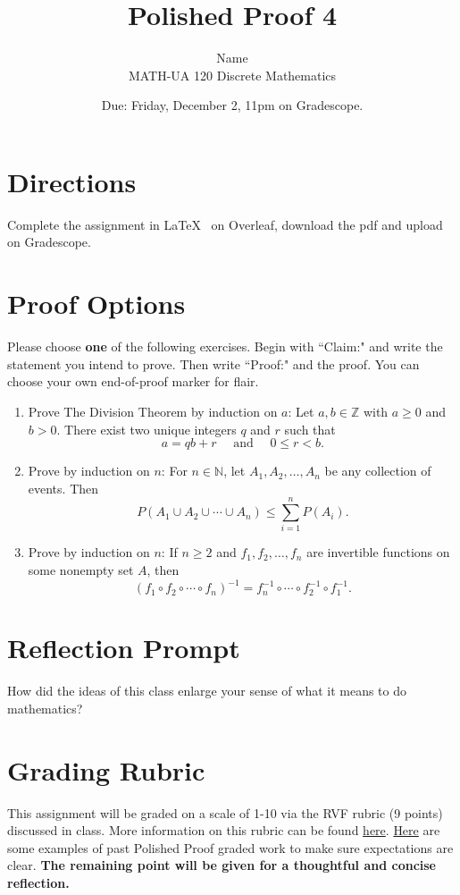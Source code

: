 \documentclass{article}
\title{Polished Proof 4}
\author{%
	Name
	\\
	MATH-UA 120 Discrete Mathematics
}
\date{Due: Friday, December 2, 11pm on Gradescope.}
\theoremstyle{definition}
\begin{document}
	\maketitle
	
	\section*{Directions}

Complete the assignment in \LaTeX~  on Overleaf, download the pdf and upload on Gradescope.


\section*{Proof Options}

Please choose \textbf{one} of the following exercises. Begin with ``Claim:" and write the statement you intend to prove. Then write ``Proof:" and the proof. You can choose your own end-of-proof marker for flair.

\begin{enumerate}
	\item  Prove The Division Theorem by induction on $a$: Let $a, b\in\mathbb{Z}$ with $a\geq 0$ and $b>0$. There exist two unique integers $q$ and $r$ such that 
	\[ a=qb+r \quad \text{ and } \quad 0\leq r<b.\] 
	\item Prove by induction on $n$: For $n\in \mathbb{N}$, let $A_1, A_2, \dots, A_n$ be any collection of events. Then 
	\[ P\left( A_1\cup A_2 \cup \cdots \cup A_n\right) \leq \sum_{i=1}^n P(A_i).\]
	\item Prove by induction on $n$: If $n\geq 2$ and $f_1, f_2, \dots, f_n$ are invertible functions on some nonempty set $A$, then 
	\[ (f_1 \circ f_2 \circ \cdots \circ f_n)^{-1} = f_n^{-1} \circ \cdots \circ f_2^{-1} \circ f_1^{-1}.\]
\end{enumerate}

\section*{Reflection Prompt}
How did the ideas of this class enlarge your sense of what it means to do mathematics?

\section*{Grading Rubric}
This assignment will be graded on a scale of 1-10 via the RVF rubric (9 points) discussed in class. More information on this rubric can be found \href{https://drive.google.com/file/d/1P0OBjw-GkX64uCpYcqYmXARapf9MwaiI/view?usp=sharing}{here}. \href{https://drive.google.com/file/d/1KAFQ7GBFpfUkyTBRZ30h5o6nXWwYDSML/view?usp=sharing}{Here} are some examples of past Polished Proof graded work to make sure expectations are clear. \textbf{The remaining point will be given for a thoughtful and concise reflection.}


	
\end{document}
